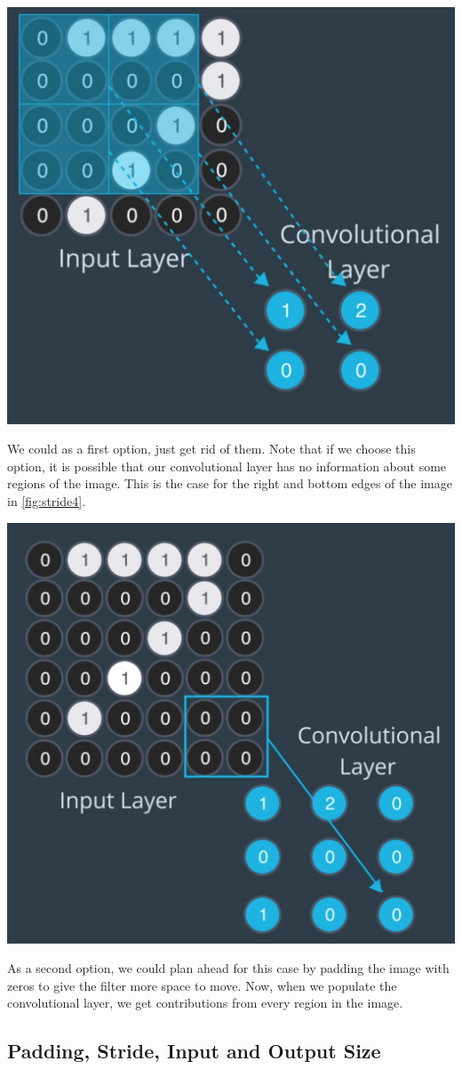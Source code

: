 \includegraphics[width=0.75\linewidth]{img//cnn//depth/stride4.png}
\label{fig:stride4}

We could as a first option, just get rid of them. Note that if we choose this option, it is possible that our convolutional layer has no information about some regions of the image. This is the case for the right and bottom edges of the image in \autoref{fig:stride4}.

\includegraphics[width=0.75\linewidth]{img//cnn//depth/stride5.png}

As a second option, we could plan ahead for this case by padding the image with zeros to give the filter more space to move.
Now, when we populate the convolutional layer, we get contributions from every region in the image.

\subsection{Padding, Stride, Input and Output Size}

